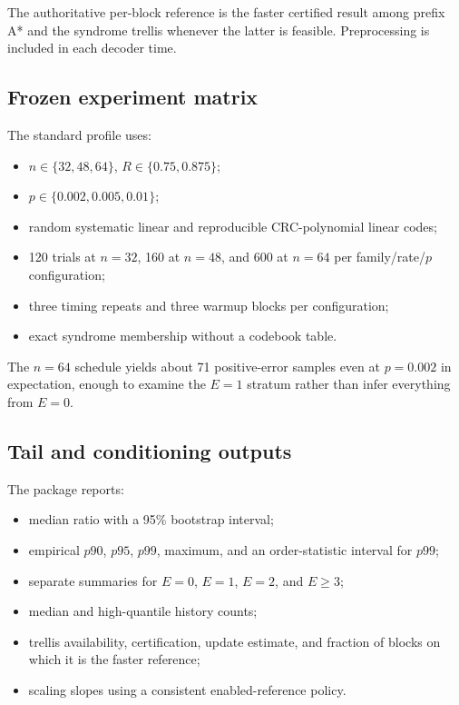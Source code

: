 \documentclass[11pt]{article}
\theoremstyle{definition}
\theoremstyle{remark}
\begin{document}
The authoritative per-block reference is the faster certified result among prefix A* and the syndrome trellis whenever the latter is feasible.  Preprocessing is included in each decoder time.

\subsection{Frozen experiment matrix}
The standard profile uses:
\begin{itemize}[leftmargin=2em]
\item $n\in\{32,48,64\}$, $R\in\{0.75,0.875\}$;
\item $p\in\{0.002,0.005,0.01\}$;
\item random systematic linear and reproducible CRC-polynomial linear codes;
\item 120 trials at $n=32$, 160 at $n=48$, and 600 at $n=64$ per family/rate/$p$ configuration;
\item three timing repeats and three warmup blocks per configuration;
\item exact syndrome membership without a codebook table.
\end{itemize}
The $n=64$ schedule yields about 71 positive-error samples even at $p=0.002$ in expectation, enough to examine the $E=1$ stratum rather than infer everything from $E=0$.

\subsection{Tail and conditioning outputs}
The package reports:
\begin{itemize}[leftmargin=2em]
\item median ratio with a 95\% bootstrap interval;
\item empirical $p90$, $p95$, $p99$, maximum, and an order-statistic interval for $p99$;
\item separate summaries for $E=0$, $E=1$, $E=2$, and $E\ge3$;
\item median and high-quantile history counts;
\item trellis availability, certification, update estimate, and fraction of blocks on which it is the faster reference;
\item scaling slopes using a consistent enabled-reference policy.
\end{itemize}
\end{document}
